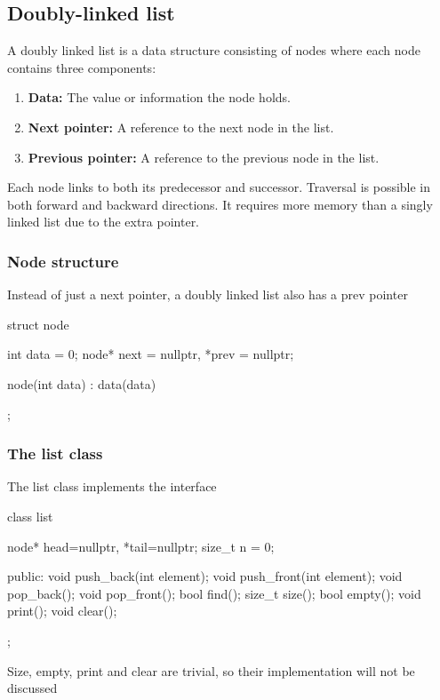 \documentclass{report}
\begin{document}
    \pagebreak 
    \subsection{Doubly-linked list}
    \bigbreak \noindent 
    A doubly linked list is a data structure consisting of nodes where each node contains three components:
    \begin{enumerate}
        \item \textbf{Data:} The value or information the node holds.
        \item \textbf{Next pointer:} A reference to the next node in the list.
        \item \textbf{Previous pointer:} A reference to the previous node in the list.
    \end{enumerate}
    \bigbreak \noindent 
    Each node links to both its predecessor and successor. Traversal is possible in both forward and backward directions. It requires more memory than a singly linked list due to the extra pointer.
    \bigbreak \noindent 
    \subsubsection{Node structure}
    \bigbreak \noindent 
    Instead of just a next pointer, a doubly linked list also has a prev pointer
    \bigbreak \noindent 
    \begin{cppcode}
    struct node {
        int data = 0;
        node* next = nullptr, *prev = nullptr;

        node(int data) : data(data) {}
    };
    \end{cppcode}

    \bigbreak \noindent 
    \subsubsection{The list class}
    \bigbreak \noindent 
    The list class implements the interface
    \bigbreak \noindent 
    \begin{cppcode}
class list {
    node* head=nullptr, *tail=nullptr;
    size_t n = 0;

public:
    void push_back(int element);
    void push_front(int element);
    void pop_back();
    void pop_front();
    bool find();
    size_t size();
    bool empty();
    void print();
    void clear();
};
    \end{cppcode}
    \bigbreak \noindent 
    Size, empty, print and clear are trivial, so their implementation will not be discussed
    \pagebreak 
\end{document}
